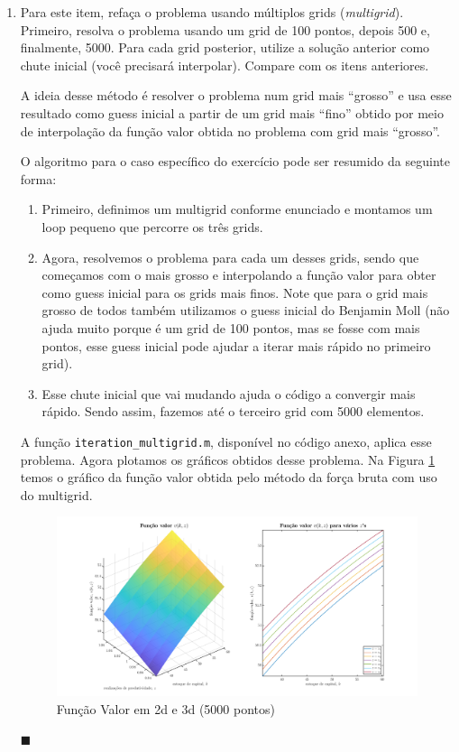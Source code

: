 \documentclass[10pt]{article}
\newcommand*{\QEDA}{\hfill\ensuremath{\blacksquare}}%
\newcommand\0{\mathbf{0}}
\newcounter{exercise}
\newcounter{problem}[exercise]
\newenvironment{sol}
    {\\[1em] {\color{magenta}\text{Resposta.}}
    }
    {{\color{blue!50!black}\QEDA}}
\begin{document}
\begin{enumerate}[wide]
\newpage

\item Para este item, refaça o problema usando múltiplos grids (\textit{multigrid}). Primeiro, resolva o problema usando um grid de 100 pontos, depois 500 e, finalmente, 5000. Para cada grid posterior, utilize a solução anterior como chute inicial (você precisará interpolar). Compare com os itens anteriores.
\begin{sol}
A ideia desse método é resolver o problema num grid mais ``grosso'' e usa esse resultado como guess inicial a partir de um grid mais ``fino'' obtido por meio de interpolação da função valor obtida no problema com grid mais ``grosso''. 

O algoritmo para o caso específico do exercício pode ser resumido da seguinte forma:

\begin{enumerate}[wide]

\item Primeiro, definimos um multigrid conforme enunciado e montamos um loop pequeno que percorre os três grids. 

\item Agora, resolvemos o problema para cada um desses grids, sendo que começamos com o mais grosso e interpolando a função valor para obter como guess inicial para os grids mais finos. 
Note que para o grid mais grosso de todos também utilizamos o guess inicial do Benjamin Moll (não ajuda muito porque é um grid de 100 pontos, mas se fosse com mais pontos, esse guess inicial pode ajudar a iterar mais rápido no primeiro grid).

\item Esse chute inicial que vai mudando ajuda o código a convergir mais rápido. Sendo assim, fazemos até o terceiro grid com 5000 elementos.

\end{enumerate} 

A função \texttt{iteration\_multigrid.m}, disponível no código anexo, aplica esse problema. Agora plotamos os gráficos obtidos desse problema. Na Figura \ref{fig5} temos o gráfico da função valor obtida pelo método da força bruta com uso do multigrid. 

\begin{figure}[htp!]
\centering
\includegraphics[scale=0.3]{value_function_brute_force_5000.png}
\caption{Função Valor em 2d e 3d (5000 pontos)}
\label{fig5}
\end{figure}




\end{sol}
\end{enumerate}
\end{document}
